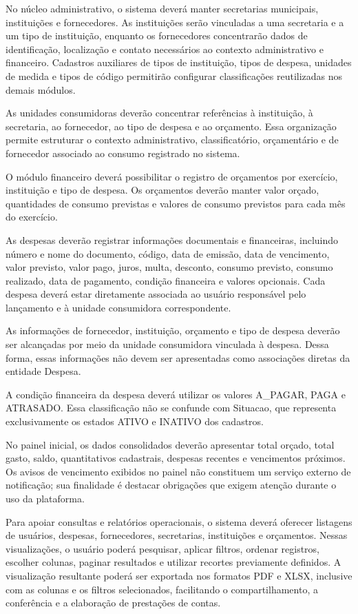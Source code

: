 No núcleo administrativo, o sistema deverá manter secretarias municipais, instituições e fornecedores. As instituições serão vinculadas a uma secretaria e a um tipo de instituição, enquanto os fornecedores concentrarão dados de identificação, localização e contato necessários ao contexto administrativo e financeiro. Cadastros auxiliares de tipos de instituição, tipos de despesa, unidades de medida e tipos de código permitirão configurar classificações reutilizadas nos demais módulos.

As unidades consumidoras deverão concentrar referências à instituição, à secretaria, ao fornecedor, ao tipo de despesa e ao orçamento. Essa organização permite estruturar o contexto administrativo, classificatório, orçamentário e de fornecedor associado ao consumo registrado no sistema.

O módulo financeiro deverá possibilitar o registro de orçamentos por exercício, instituição e tipo de despesa. Os orçamentos deverão manter valor orçado, quantidades de consumo previstas e valores de consumo previstos para cada mês do exercício.

As despesas deverão registrar informações documentais e financeiras, incluindo número e nome do documento, código, data de emissão, data de vencimento, valor previsto, valor pago, juros, multa, desconto, consumo previsto, consumo realizado, data de pagamento, condição financeira e valores opcionais. Cada despesa deverá estar diretamente associada ao usuário responsável pelo lançamento e à unidade consumidora correspondente.

As informações de fornecedor, instituição, orçamento e tipo de despesa deverão ser alcançadas por meio da unidade consumidora vinculada à despesa. Dessa forma, essas informações não devem ser apresentadas como associações diretas da entidade Despesa.

A condição financeira da despesa deverá utilizar os valores A\_PAGAR, PAGA e ATRASADO. Essa classificação não se confunde com Situacao, que representa exclusivamente os estados ATIVO e INATIVO dos cadastros.

No painel inicial, os dados consolidados deverão apresentar total orçado, total gasto, saldo, quantitativos cadastrais, despesas recentes e vencimentos próximos. Os avisos de vencimento exibidos no painel não constituem um serviço externo de notificação; sua finalidade é destacar obrigações que exigem atenção durante o uso da plataforma.

Para apoiar consultas e relatórios operacionais, o sistema deverá oferecer listagens de usuários, despesas, fornecedores, secretarias, instituições e orçamentos. Nessas visualizações, o usuário poderá pesquisar, aplicar filtros, ordenar registros, escolher colunas, paginar resultados e utilizar recortes previamente definidos. A visualização resultante poderá ser exportada nos formatos PDF e XLSX, inclusive com as colunas e os filtros selecionados, facilitando o compartilhamento, a conferência e a elaboração de prestações de contas.

